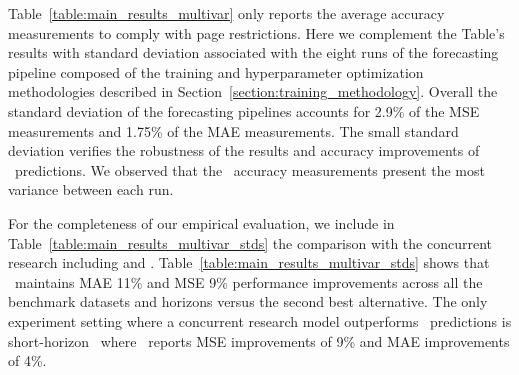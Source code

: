 Table~\ref{table:main_results_multivar} only reports the average accuracy measurements to comply with page restrictions. Here we complement the Table's results with standard deviation associated with the eight runs of the forecasting pipeline composed of the training and hyperparameter optimization methodologies described in  Section~\ref{section:training_methodology}. Overall the standard deviation of the forecasting pipelines accounts for 2.9\% of the MSE measurements and 1.75\% of the MAE measurements. The small standard deviation verifies the robustness of the results and accuracy improvements of \ours\ predictions. We observed that the \Exchange\ accuracy measurements present the most variance between each run. 

For the completeness of our empirical evaluation, we include in Table~\ref{table:main_results_multivar_stds} the comparison with the concurrent research including \ETSformer and \Preformer \citep{wooETSformer2022, dazhaoPreformer2022}. Table~\ref{table:main_results_multivar_stds} shows that \ours\ maintains MAE 11\% and MSE 9\% performance improvements across all the benchmark datasets and horizons versus the second best alternative. The only experiment setting where a concurrent research model outperforms \ours\ predictions is short-horizon \Exchange\ where \ETSformer\ reports MSE improvements of 9\% and MAE improvements of 4\%.





